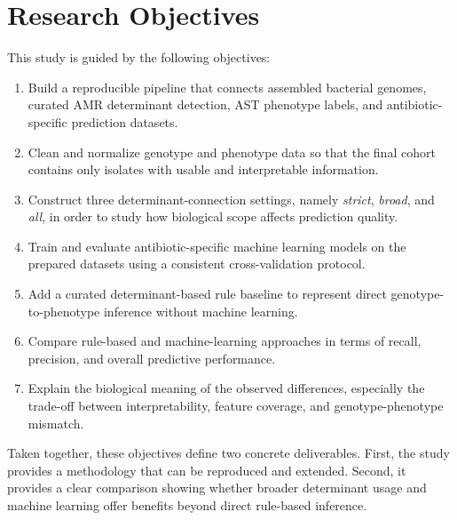 \section{Research Objectives}

This study is guided by the following objectives:

\begin{enumerate}[label=\arabic*.]
    \item Build a reproducible pipeline that connects assembled bacterial genomes, curated AMR determinant detection, AST phenotype labels, and antibiotic-specific prediction datasets.
    \item Clean and normalize genotype and phenotype data so that the final cohort contains only isolates with usable and interpretable information.
    \item Construct three determinant-connection settings, namely \textit{strict}, \textit{broad}, and \textit{all}, in order to study how biological scope affects prediction quality.
    \item Train and evaluate antibiotic-specific machine learning models on the prepared datasets using a consistent cross-validation protocol.
    \item Add a curated determinant-based rule baseline to represent direct genotype-to-phenotype inference without machine learning.
    \item Compare rule-based and machine-learning approaches in terms of recall, precision, and overall predictive performance.
    \item Explain the biological meaning of the observed differences, especially the trade-off between interpretability, feature coverage, and genotype-phenotype mismatch.
\end{enumerate}

Taken together, these objectives define two concrete deliverables. First, the study provides a methodology that can be reproduced and extended. Second, it provides a clear comparison showing whether broader determinant usage and machine learning offer benefits beyond direct rule-based inference.
